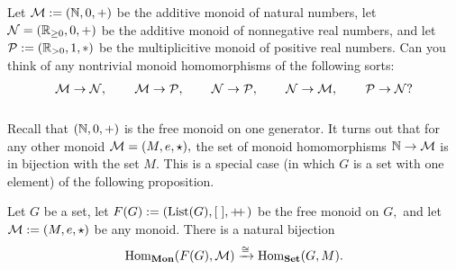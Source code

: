\documentclass[CT4S-EN-RU]{subfiles}
\begin{document}
\begin{exerciseRUS}
\end{exerciseRUS}

\begin{exerciseENG}
Let $\mathcal{M}:=({\mathbb N},0,+)$ be the additive monoid of natural numbers, let $\mathcal{N}=({\mathbb R}_{\geq0},0,+)$ be the additive monoid of nonnegative real numbers, and let $\mathcal{P}:=({\mathbb R}_{>0},1,*)$ be the multiplicitive monoid of positive real numbers. Can you think of any nontrivial monoid homomorphisms of the following sorts: $$\mathcal{M}\rightarrow\mathcal{N},\hspace{.3in}\mathcal{M}\rightarrow\mathcal{P},\hspace{.3in}\mathcal{N}\rightarrow\mathcal{P},\hspace{.3in} \mathcal{N}\rightarrow\mathcal{M},\hspace{.3in}\mathcal{P}\rightarrow\mathcal{N}?$$
\end{exerciseENG}

\begin{exerciseRUS}
\end{exerciseRUS}



\subsubsection{}

\begin{blockENG}
Recall that $({\mathbb N},0,+)$ is the free monoid on one generator. It turns out that for any other monoid $\mathcal{M}=(M,e,\star),$ the set of monoid homomorphisms ${\mathbb N}\rightarrow\mathcal{M}$ is in bijection with the set $M.$ This is a special case (in which $G$ is a set with one element) of the following proposition.
\end{blockENG}

\begin{blockRUS}
\end{blockRUS}

\begin{propositionENG}\label{prop:free monoid}
Let $G$ be a set, let $F(G):=(\textnormal{List}(G),[\;],+\!\!+\hspace{1pt})$ be the free monoid on $G,$ and let $\mathcal{M}:=(M,e,\star)$ be any monoid. There is a natural bijection
$$\textnormal{Hom}_{\mathbf{Mon}}(F(G),\mathcal{M})\xrightarrow{\cong}\textnormal{Hom}_{\mathbf{Set}}(G,M).$$
\end{propositionENG}

\begin{propositionRUS}\label{prop:free monoid}
\end{propositionRUS}
\end{document}
